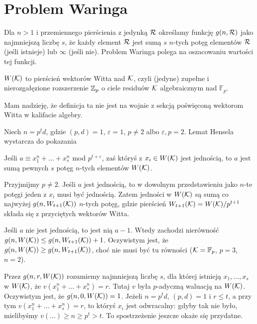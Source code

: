 \section{Problem Waringa} %
Dla $n > 1$ i przemiennego pierścienia z jedynką $\mathcal R$ określamy funkcję $g(n, \mathcal R)$ jako najmniejszą liczbę $s$, że każdy element $\mathcal R$ jest sumą $s$ $n$-tych potęg elementów $\mathcal R$ (jeśli istnieje) lub $\infty$ (jeśli nie).
Problem Waringa polega na oszacowaniu wartości tej funkcji.

\begin{definicja}
	$W(\mathcal K)$ to pierścień wektorów Witta nad $\mathcal K$, czyli (jedyne) zupełne i nierozgałęzione rozszerzenie $\mathbb Z_p$ o ciele residuów $\mathcal K$ algebraicznym nad $\mathbb F_p$.
\end{definicja}

Mam nadzieję, że definicja ta nie jest na wojnie z sekcją poświęconą wektorom Witta w kalifacie algebry.

Niech $n = p^t d$, gdzie $(p, d) = 1$, $\varepsilon = 1$, $p \neq 2$ albo $\varepsilon, p = 2$.
Lemat Hensela wystarcza do pokazania

\begin{wniosek}
Jeśli $a \equiv x_1^n + \ldots + x_s^n$ mod $p^{t + \varepsilon}$, zaś któryś z $x_i \in W(\mathcal K)$ jest jednością, to $a$ jest sumą pewnych $s$  potęg $n$-tych elementów $W(\mathcal K)$.
\end{wniosek}

Przyjmijmy $p \neq 2$.
Jeśli $a$ jest jednością, to w dowolnym przedstawieniu jako $n$-te potęgi jeden z $x_i$ musi być jednością.
Zatem jedności w $W(\mathcal K)$ są sumą co najwyżej $g(n, W_{t+1}(\mathcal K))$ $n$-tych potęg, gdzie pierścień $W_{t+1}(\mathcal K) = W(\mathcal K) / p^{t+1}$ składa się z przyciętych wektorów Witta.

Jeśli $a$ nie jest jednością, to jest nią $a-1$. Wtedy zachodzi nierówność $g(n, W(\mathcal K)) \le g(n, W_{t+1}(\mathcal K)) + 1$.
Oczywistym jest, że $g(n, W(\mathcal K)) \ge g(n, W_{t+1}(\mathcal K))$, choć nie musi być tu równości ($\mathcal K = \mathbb F_p$, $p = 3$, $n = 2$).

Przez $g(n,r,W(\mathcal K))$ rozumiemy najmniejszą liczbę $s$, dla której istnieją $x_1, \ldots, x_s$ w $W(\mathcal K)$, że $v(x_1^n + \ldots + x_s^n) = r$.
Tutaj $v$ była $p$-adyczną waluacją na $W(\mathcal K)$.
Oczywistym jest, że $g(n, 0, W(\mathcal K)) = 1$.
Jeżeli $n = p^td$, $(p, d) = 1$ i $r \le t$, a przy tym $v(x_1^n + \ldots + x_s^n) = r$, to któryś $x_i$ jest odwracalny: gdyby tak nie było, mielibyśmy $v(\ldots) \ge n \ge p^t > t$.
To spostrzeżenie jeszcze okaże się przydatne.

